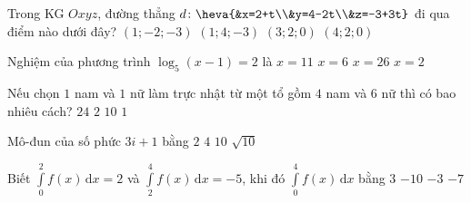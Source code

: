 \begin{ex}%
Trong KG $Oxyz$, đường thẳng $d\colon \heva{&x=2+t\\&y=4-2t\\&z=-3+3t}$	đi qua điểm nào dưới đây?
	\choice
	{$(1;-2;-3)$}
	{$(1;4;-3)$}
	{\True $(3;2;0)$}
	{$(4;2;0)$}
\end{ex}

\begin{ex}%
	Nghiệm của phương trình $\log_5(x-1)=2$ là
	\choice
	{$x=11$}
	{$x=6$}
	{\True $x=26$}
	{$x=2$}
\end{ex}

\begin{ex}%
	Nếu chọn $1$ nam và $1$ nữ làm trực nhật từ một tổ gồm $4$ nam và $6$ nữ thì có bao nhiêu cách?
	\choice
	{\True $24$}
	{$2$}
	{$10$}
	{$1$}
\end{ex}

\begin{ex}%
	Mô-đun của số phức $3i+1$ bằng
	\choice
	{$2$}
	{$4$}
	{$10$}
	{\True $\sqrt{10}$}
\end{ex}

\begin{ex}%
	Biết $\displaystyle\int\limits_{0}^{2}f(x)\mathrm{\,d}x=2$ và $\displaystyle\int\limits_{2}^{4}f(x)\mathrm{\,d}x=-5$, khi đó $\displaystyle\int\limits_{0}^{4}f(x)\mathrm{\,d}x$ bằng
	\choice
	{$3$}
	{$-10$}
	{\True $-3$}
	{$-7$}
\end{ex}

